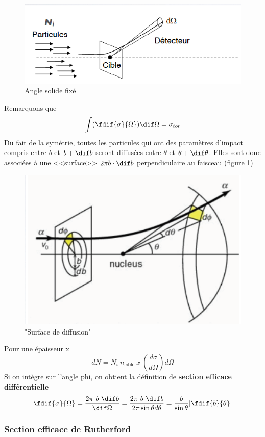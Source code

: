 \begin{figure}[ht]
    \centering
    \includegraphics[scale=0.75]{Images1/anglesolide.PNG}
    \caption{Angle solide fixé}
\end{figure}
Remarquons que
\[
    \int(\fdif{\sigma}{\Omega})\dif \Omega=\sigma_{tot}
\]
Du fait de la symétrie, toutes les particules qui ont des paramètres d'impact compris entre $b$ et $b+\dif b$ seront diffusées entre $\theta$ et $\theta+\dif\theta$. Elles sont donc associées à une <<surface>> $2\pi b\cdot \dif b$ perpendiculaire au faisceau (figure \ref{fig:surface_de_diffusion})
\begin{figure}[ht]
    \centering
    \includegraphics[scale=0.75]{Images1/surface_perp.PNG}
    \caption{"Surface de diffusion"}
    \label{fig:surface_de_diffusion}
\end{figure}
Pour une épaisseur x
\[
    dN=N_i~n_{\text{cible}}~x~(\dfrac{d\sigma}{d\Omega})d\Omega
\]
Si on intègre sur l'angle phi, on obtient la définition de \textbf{section efficace différentielle}
\[
    \fdif{\sigma}{\Omega}=\dfrac{2\pi~ b~\dif b}{\dif \Omega}=\dfrac{2\pi~b~\dif b}{2\pi \sin{\theta}d\theta}=\dfrac{b}{\sin{\theta}}\abs{\fdif{b}{\theta}}
\]

\subsubsection{Section efficace de Rutherford}

